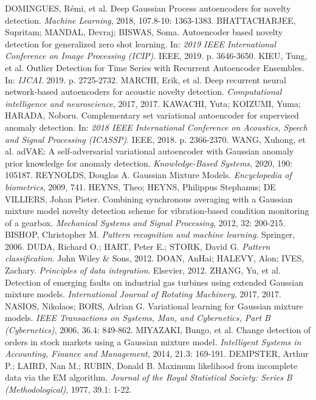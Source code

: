 \documentclass[11pt,twoside,openright]{report}
\begin{document}
\begin{thebibliography}{L}
DOMINGUES, Rémi, et al. Deep Gaussian Process autoencoders for novelty detection. \textit{Machine Learning}, 2018, 107.8-10: 1363-1383.
BHATTACHARJEE, Supritam; MANDAL, Devraj; BISWAS, Soma. Autoencoder based novelty detection for generalized zero shot learning. In: \textit{2019 IEEE International Conference on Image Processing (ICIP)}. IEEE, 2019. p. 3646-3650.
KIEU, Tung, et al. Outlier Detection for Time Series with Recurrent Autoencoder Ensembles. In: \textit{IJCAI}. 2019. p. 2725-2732.
MARCHI, Erik, et al. Deep recurrent neural network-based autoencoders for acoustic novelty detection. \textit{Computational intelligence and neuroscience}, 2017, 2017.
KAWACHI, Yuta; KOIZUMI, Yuma; HARADA, Noboru. Complementary set variational autoencoder for supervised anomaly detection. In: \textit{2018 IEEE International Conference on Acoustics, Speech and Signal Processing (ICASSP)}. IEEE, 2018. p. 2366-2370.
WANG, Xuhong, et al. adVAE: A self-adversarial variational autoencoder with Gaussian anomaly prior knowledge for anomaly detection. \textit{Knowledge-Based Systems}, 2020, 190: 105187.
REYNOLDS, Douglas A. Gaussian Mixture Models. \textit{Encyclopedia of biometrics}, 2009, 741.
HEYNS, Theo; HEYNS, Philippus Stephanus; DE VILLIERS, Johan Pieter. Combining synchronous averaging with a Gaussian mixture model novelty detection scheme for vibration-based condition monitoring of a gearbox. \textit{Mechanical Systems and Signal Processing}, 2012, 32: 200-215.
BISHOP, Christopher M. \textit{Pattern recognition and machine learning}. Springer, 2006.
DUDA, Richard O.; HART, Peter E.; STORK, David G. \textit{Pattern classification}. John Wiley \& Sons, 2012.
DOAN, AnHai; HALEVY, Alon; IVES, Zachary. \textit{Principles of data integration}. Elsevier, 2012.
ZHANG, Yu, et al. Detection of emerging faults on industrial gas turbines using extended Gaussian mixture models. \textit{International Journal of Rotating Machinery}, 2017, 2017.
NASIOS, Nikolaos; BORS, Adrian G. Variational learning for Gaussian mixture models. \textit{IEEE Transactions on Systems, Man, and Cybernetics, Part B (Cybernetics)}, 2006, 36.4: 849-862.
MIYAZAKI, Bungo, et al. Change detection of orders in stock markets using a Gaussian mixture model. \textit{Intelligent Systems in Accounting, Finance and Management}, 2014, 21.3: 169-191.
DEMPSTER, Arthur P.; LAIRD, Nan M.; RUBIN, Donald B. Maximum likelihood from incomplete data via the EM algorithm. \textit{Journal of the Royal Statistical Society: Series B (Methodological)}, 1977, 39.1: 1-22.

\end{thebibliography}
\end{document}
